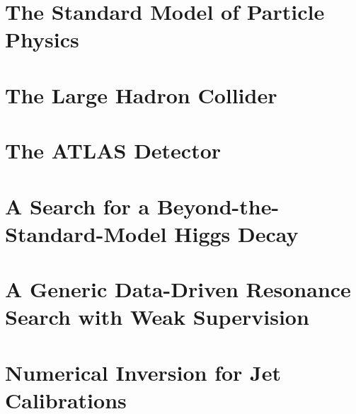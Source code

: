 \documentclass[12pt]{report}
\begin{document}

\chapter{The Standard Model of Particle Physics}
\label{ch:SM}

\chapter{The Large Hadron Collider}
\label{ch:LHC}

\chapter{The ATLAS Detector}
\label{ch:ATLAS}



\chapter{A Search for a Beyond-the-Standard-Model Higgs Decay}
\label{ch:HBSM}

\chapter{A Generic Data-Driven Resonance Search with Weak Supervision}
\label{ch:CWoLa}

\chapter{Numerical Inversion for Jet Calibrations}
\label{ch:NI}
\end{document}
